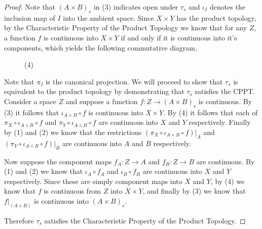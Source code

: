 \documentclass[minion]{homework651}
\begin{document}
\begin{problems}
\begin{proof}
Note that $(A \times B)_s$ in (3) indicates open under $\tau_s$ and $\iota_I$ denotes the inclusion map of $I$ into the ambient space. Since $X \times Y$ has the product topology, by the Characteristic Property of the Product Topology
we know that for any $Z$, a function $f$ is continuous into $X \times Y$ if and only if it is continuous into it's components, which yields the following commutative diagram, 
\begin{figure}[!h]
    \centering
    \caption{(4)}     
\end{figure}

Note that $\pi_I$ is the canonical projection. We will proceed to show that $\tau_s$ is equivalent to the product topology by demonstrating that $\tau_s$ satisfies the CPPT. 
Consider a space $Z$ and suppose a function $f: Z \to (A\times B)_s$ is continuous. By (3) it follows that $\iota_{A\times B} \circ f$ is continuous into $X \times Y$. By (4)
it follows that each of $\pi_{X} \circ \iota_{A\times B} \circ f$  and $\pi_{Y} \circ \iota_{A\times B} \circ f$ are continuous into $X$ and $Y$ respectively. Finally by (1) and (2)
we know that the restrictions  $(\pi_{X} \circ \iota_{A\times B} \circ f)|_A$  and $(\pi_{Y} \circ \iota_{A\times B} \circ f)|_B$ are continuous into $A$ and $B$ respectively. 



Now suppose the component maps $f_A: Z \to A$ and $f_B: Z \to B$ are continuous. By (1) and (2) we know that $\iota_A\circ f_A$ and $\iota_B\circ f_B$ are continuous into $X$ and $Y$
respectively. Since these are simply component maps into $X$ and $Y$, by (4) we know that $f$ is continuous from $Z$ into $X \times Y$, and finally by (3) we know that $f|_{(A\times B)}$ is continuous into 
$(A\times B)_s$. 

Therefore $\tau_s$ satisfies the Characteristic Property of the Product Topology.
    
\end{proof}









\end{problems}
\end{document}
